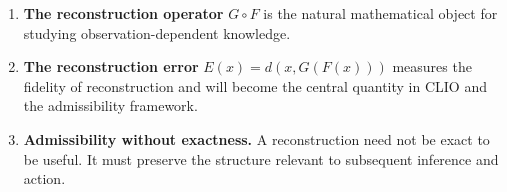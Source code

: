 \begin{enumerate}[leftmargin=2em]
  \item \textbf{The reconstruction operator} $G \circ F$ is the
    natural mathematical object for studying observation-dependent
    knowledge.

  \item \textbf{The reconstruction error} $E(x) = d(x, G(F(x)))$
    measures the fidelity of reconstruction and will become the
    central quantity in CLIO and the admissibility framework.

  \item \textbf{Admissibility without exactness.}
    A reconstruction need not be exact to be useful.
    It must preserve the structure relevant to subsequent
    inference and action.
\end{enumerate}

